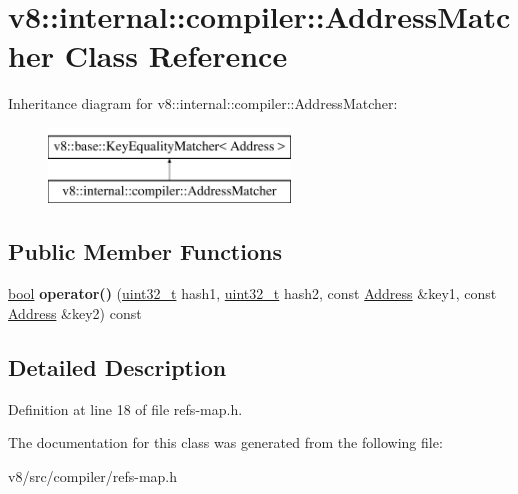 \hypertarget{classv8_1_1internal_1_1compiler_1_1AddressMatcher}{}\section{v8\+:\+:internal\+:\+:compiler\+:\+:Address\+Matcher Class Reference}
\label{classv8_1_1internal_1_1compiler_1_1AddressMatcher}
Inheritance diagram for v8\+:\+:internal\+:\+:compiler\+:\+:Address\+Matcher\+:\begin{figure}[H]
\begin{center}
\leavevmode
\includegraphics[height=2.000000cm]{classv8_1_1internal_1_1compiler_1_1AddressMatcher}
\end{center}
\end{figure}
\subsection*{Public Member Functions}
\begin{DoxyCompactItemize}
\item 
\mbox{\label{classv8_1_1internal_1_1compiler_1_1AddressMatcher_a3a652a1601f8ed33ec5e964e2f96f0a8}} 
\mbox{\hyperlink{classbool}{bool}} {\bfseries operator()} (\mbox{\hyperlink{classuint32__t}{uint32\+\_\+t}} hash1, \mbox{\hyperlink{classuint32__t}{uint32\+\_\+t}} hash2, const \mbox{\hyperlink{classuintptr__t}{Address}} \&key1, const \mbox{\hyperlink{classuintptr__t}{Address}} \&key2) const
\end{DoxyCompactItemize}


\subsection{Detailed Description}


Definition at line 18 of file refs-\/map.\+h.



The documentation for this class was generated from the following file\+:\begin{DoxyCompactItemize}
\item 
v8/src/compiler/refs-\/map.\+h\end{DoxyCompactItemize}
